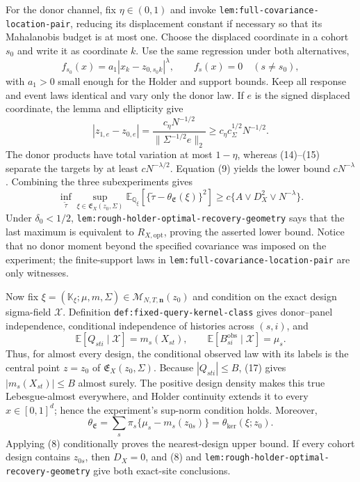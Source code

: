 For the donor channel, fix \(\eta\in(0,1)\) and invoke \texttt{lem:full-covariance-location-pair}, reducing its displacement constant if necessary so that its Mahalanobis budget is at most one.  Choose the displaced coordinate in a cohort \(s_0\) and write it as coordinate \(k\).  Use the same regression under both alternatives,
\[
 f_{s_0}(x)=a_1|x_k-z_{0,s_0k}|^\lambda,
 \qquad f_s(x)=0\quad(s\ne s_0),                            \tag{14}
\]
with \(a_1>0\) small enough for the Holder and support bounds.  Keep all response and event laws identical and vary only the donor law.  If \(e\) is the signed displaced coordinate, the lemma and ellipticity give
\[
 |z_{1,e}-z_{0,e}|=
 \frac{c_\eta N^{-1/2}}{\|\Sigma^{-1/2}e\|_2}
 \ge c_\eta c_\Sigma^{1/2}N^{-1/2}.                       \tag{15}
\]
The donor products have total variation at most \(1-\eta\), whereas (14)--(15) separate the targets by at least \(cN^{-\lambda/2}\).  Equation (9) yields the lower bound \(cN^{-\lambda}\).  Combining the three subexperiments gives
\[
 \inf_{\widetilde\tau}\sup_{\xi\in\mathfrak E_X(z_0,\Sigma)}
 \mathbb E_{\mathbb Q_\xi}
 \left[\{\widetilde\tau-\theta_{\mathfrak E}(\xi)\}^2\right]
 \ge c\{A\vee D_X^2\vee N^{-\lambda}\}.                  \tag{16}
\]
Under \(\delta_0<1/2\), \texttt{lem:rough-holder-optimal-recovery-geometry} says that the last maximum is equivalent to \(R_{X,\mathrm{opt}}\), proving the asserted lower bound.  Notice that no donor moment beyond the specified covariance was imposed on the experiment; the finite-support laws in \texttt{lem:full-covariance-location-pair} are only witnesses.

Now fix \(\xi=(\mathbb K_\xi;\mu,m,\Sigma)\in
\mathcal M_{N,T,\mathbf n}(z_0)\) and condition on the exact design sigma-field \(\mathcal X\).  Definition \texttt{def:fixed-query-kernel-class} gives donor--panel independence, conditional independence of histories across \((s,i)\), and
\[
 \mathbb E[Q_{sti}\mid\mathcal X]=m_s(X_{st}),
 \qquad
 \mathbb E[B_{si}^{\mathrm{obs}}\mid\mathcal X]=\mu_s.     \tag{17}
\]
Thus, for almost every design, the conditional observed law with its labels is the central point \(z=z_0\) of \(\mathfrak E_X(z_0,\Sigma)\).  Because \(|Q_{sti}|\le B\), (17) gives \(|m_s(X_{st})|\le B\) almost surely.  The positive design density makes this true Lebesgue-almost everywhere, and Holder continuity extends it to every \(x\in[0,1]^d\); hence the experiment's sup-norm condition holds.  Moreover,
\[
 \theta_{\mathfrak E}
 =\sum_s\pi_s\{\mu_s-m_s(z_{0s})\}
 =\theta_{\mathrm{ker}}(\xi;z_0).                           \tag{18}
\]
Applying (8) conditionally proves the nearest-design upper bound.  If every cohort design contains \(z_{0s}\), then \(D_X=0\), and (8) and \texttt{lem:rough-holder-optimal-recovery-geometry} give both exact-site conclusions.

